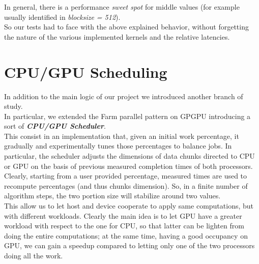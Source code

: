 	In general, there is a performance \textit{sweet spot} for middle values (for example usually identified in \textit{blocksize = 512}).\\
	So our tests had to face with the above explained behavior, without forgetting the nature of the various implemented kernels and the relative latencies.


\section{CPU/GPU Scheduling}
\label{sect:cpugpuscheduling}
In addition to the main logic of our project we introduced another branch of study.\\
In particular, we extended the Farm parallel pattern on GPGPU introducing a sort of \textit{\textbf{CPU/GPU Scheduler}}.\\
This consist in an implementation that, given an initial work percentage, it gradually and experimentally tunes those percentages to balance jobs.
In particular, the scheduler adjusts the dimensions of data chunks directed to CPU or GPU on the basis of previous measured completion times of both processors.\\
Clearly, starting from a user provided percentage, measured times are used to recompute percentages (and thus chunks dimension). So, in a finite number of algorithm steps, the two portion size will stabilize around two values.\\
This allow us to let host and device cooperate to apply same computations, but with different workloads. Clearly the main idea is to let GPU have a greater workload with respect to the one for CPU, so that  latter can be lighten from doing the entire computations; at the same time, having a good occupancy on GPU, we can gain a speedup compared to letting only one of the two processors doing all the work.\\

	
